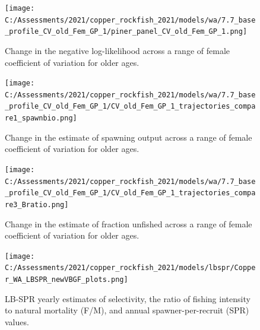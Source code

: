 \documentclass[11pt,
  english,
  a4paper,
]{article}
\begin{document}
\tagmcend\tagstructend


\begin{figure}
\centering
\texttt{[image: C:/Assessments/2021/copper\_rockfish\_2021/models/wa/7.7\_base\_profile\_CV\_old\_Fem\_GP\_1/piner\_panel\_CV\_old\_Fem\_GP\_1.png]}
\caption{Change in the negative log-likelihood across a range of female coefficient of variation for older ages.\label{fig:cv-profile}}
\end{figure}

\tagmcend\tagstructend


\begin{figure}
\centering
\texttt{[image: C:/Assessments/2021/copper\_rockfish\_2021/models/wa/7.7\_base\_profile\_CV\_old\_Fem\_GP\_1/CV\_old\_Fem\_GP\_1\_trajectories\_compare1\_spawnbio.png]}
\caption{Change in the estimate of spawning output across a range of female coefficient of variation for older ages.\label{fig:cv-ssb}}
\end{figure}

\tagmcend\tagstructend


\begin{figure}
\centering
\texttt{[image: C:/Assessments/2021/copper\_rockfish\_2021/models/wa/7.7\_base\_profile\_CV\_old\_Fem\_GP\_1/CV\_old\_Fem\_GP\_1\_trajectories\_compare3\_Bratio.png]}
\caption{Change in the estimate of fraction unfished across a range of female coefficient of variation for older ages.\label{fig:cv-depl}}
\end{figure}

\tagmcend\tagstructend

\newpage


\begin{figure}
\centering
\texttt{[image: C:/Assessments/2021/copper\_rockfish\_2021/models/lbspr/Copper\_WA\_LBSPR\_newVBGF\_plots.png]}
\caption{LB-SPR yearly estimates of selectivity, the ratio of fishing intensity to natural mortality (F/M), and annual spawner-per-recruit (SPR) values.\label{fig:lbspr}}
\end{figure}
\end{document}
